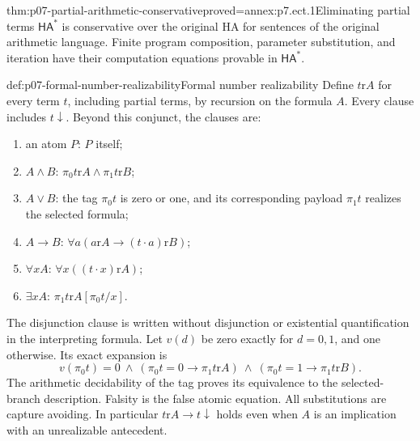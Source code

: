 \begin{hblemma}{thm:p07-partial-arithmetic-conservative}{proved=annex:p7.ect.1}{Eliminating partial terms}
\(\mathsf{HA}^{\ast}\) is conservative over the original HA for
sentences of the original arithmetic language. Finite program
composition, parameter substitution, and iteration have their
computation equations provable in \(\mathsf{HA}^{\ast}\).
\end{hblemma}

\begin{hbdefinition}{def:p07-formal-number-realizability}{Formal number realizability}
Define \(t\mathrel{\mathrm r}A\) for every term \(t\), including
partial terms, by recursion on the formula \(A\). Every clause
includes \(t\downarrow\). Beyond this conjunct, the clauses are:
\begin{enumerate}
\item an atom \(P\): \(P\) itself;
\item \(A\land B\):
      \(\pi_0t\mathrel{\mathrm r}A\land
        \pi_1t\mathrel{\mathrm r}B\);
\item \(A\lor B\): the tag \(\pi_0t\) is zero or one,
      and its corresponding payload \(\pi_1t\) realizes the
      selected formula;
\item \(A\to B\):
      \(\forall a(a\mathrel{\mathrm r}A\to
                      (t\mathbin{\cdot}a)\mathrel{\mathrm r}B)\);
\item \(\forall xA\):
      \(\forall x((t\mathbin{\cdot}x)\mathrel{\mathrm r}A)\);
\item \(\exists xA\):
      \(\pi_1t\mathrel{\mathrm r}A[\pi_0t/x]\).
\end{enumerate}
The disjunction clause is written without disjunction or existential
quantification in the interpreting formula. Let \(v(d)\) be zero
exactly for \(d=0,1\), and one otherwise. Its exact expansion is
\[
 v(\pi_0t)=0\ \land\
 (\pi_0t=0\to\pi_1t\mathrel{\mathrm r}A)\ \land\
 (\pi_0t=1\to\pi_1t\mathrel{\mathrm r}B).
\]
The arithmetic decidability of the tag proves its equivalence to the
selected-branch description. Falsity is the false atomic equation.
All substitutions are capture avoiding. In particular
\(t\mathrel{\mathrm r}A\to t\downarrow\) holds even when
\(A\) is an implication with an unrealizable antecedent.
\end{hbdefinition}

